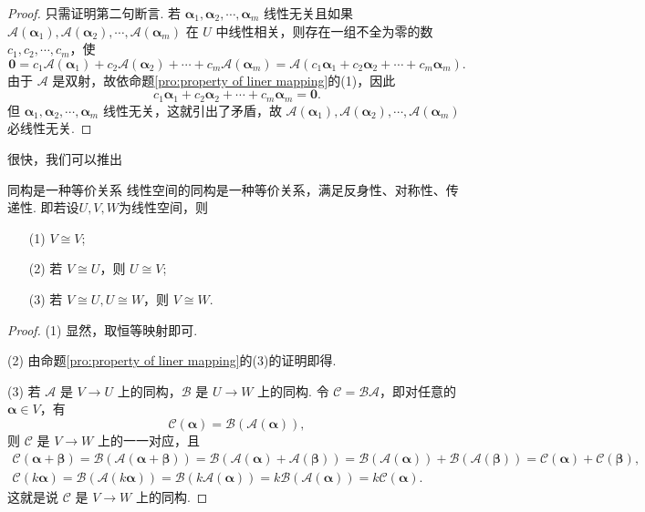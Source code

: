 \documentclass[12pt, a4paper,newtx]{ctexart}
\begin{document}
\begin{proof}
	只需证明第二句断言. 若 $\bm{\alpha}_1, \bm{\alpha}_2, \cdots, \bm{\alpha}_m$ 线性无关且如果 $\mathcal A(\bm{\alpha}_1), \mathcal A(\bm{\alpha}_2), \cdots, \mathcal A(\bm{\alpha}_m)$ 在 $U$ 中线性相关，则存在一组不全为零的数 $c_1, c_2, \cdots, c_m$，使
	\[
	\bm{0}=c_1\mathcal A(\bm{\alpha}_1) + c_2\mathcal A(\bm{\alpha}_2) + \cdots + c_m\mathcal A(\bm{\alpha}_m) =\mathcal A(c_1\bm{\alpha}_1 + c_2\bm{\alpha}_2 + \cdots + c_m\bm{\alpha}_m).
	\]
	由于 $\mathcal A$ 是双射，故依命题\ref{pro:property of liner mapping}的(1)，因此
	\[
	c_1\bm{\alpha}_1 + c_2\bm{\alpha}_2 + \cdots + c_m\bm{\alpha}_m = \bm{0}.
	\]
	但 $\bm{\alpha}_1, \bm{\alpha}_2, \cdots, \bm{\alpha}_m$ 线性无关，这就引出了矛盾，故 $\mathcal A(\bm{\alpha}_1), \mathcal A(\bm{\alpha}_2), \cdots, \mathcal A(\bm{\alpha}_m)$ 必线性无关. 
\end{proof}
很快，我们可以推出\begin{proposition}{同构是一种等价关系}{}
	线性空间的同构是一种等价关系，满足反身性、对称性、传递性. 即若设$U,V,W$为线性空间，则\begin{enumerate}
		\item[(1)] $V \cong V$;
		\item[(2)] 若 $V \cong U$，则 $U \cong V$;
		\item[(3)] 若 $V \cong U, U \cong W$，则 $V \cong W$. 
	\end{enumerate}
\end{proposition}
\begin{proof}
	\item[(1)] 显然，取恒等映射即可. 
	\item[(2)] 由命题\ref{pro:property of liner mapping}的(3)的证明即得. 
	\item[(3)] 若 $\mathcal{A}$ 是 $V \rightarrow U$ 上的同构，$\mathcal{B}$ 是 $U \rightarrow W$ 上的同构. 令 $\mathcal{C} = \mathcal{B} \mathcal{A}$，即对任意的 $\bm{\alpha} \in V$，有
	\[
	\mathcal{C}(\bm{\alpha}) = \mathcal{B}(\mathcal{A}(\bm{\alpha})),
	\]
	则 $\mathcal{C}$ 是 $V \rightarrow W$ 上的一一对应，且\begin{gather*}
			\mathcal{C}(\bm{\alpha} + \bm{\beta}) = \mathcal{B}(\mathcal{A}(\bm{\alpha} + \bm{\beta})) = \mathcal{B}(\mathcal{A}(\bm{\alpha}) + \mathcal{A}(\bm{\beta}))
		= \mathcal{B}(\mathcal{A}(\bm{\alpha})) + \mathcal{B}(\mathcal{A}(\bm{\beta}))
		= \mathcal{C}(\bm{\alpha}) + \mathcal{C}(\bm{\beta}),\\\mathcal{C}(k\bm{\alpha}) = \mathcal{B}(\mathcal{A}(k\bm{\alpha})) = \mathcal{B}(k\mathcal{A}(\bm{\alpha}))
		= k\mathcal{B}(\mathcal{A}(\bm{\alpha})) = k\mathcal{C}(\bm{\alpha}).
	\end{gather*}
	这就是说 $\mathcal{C}$ 是 $V \rightarrow W$ 上的同构. 
\end{proof}
\end{document}
